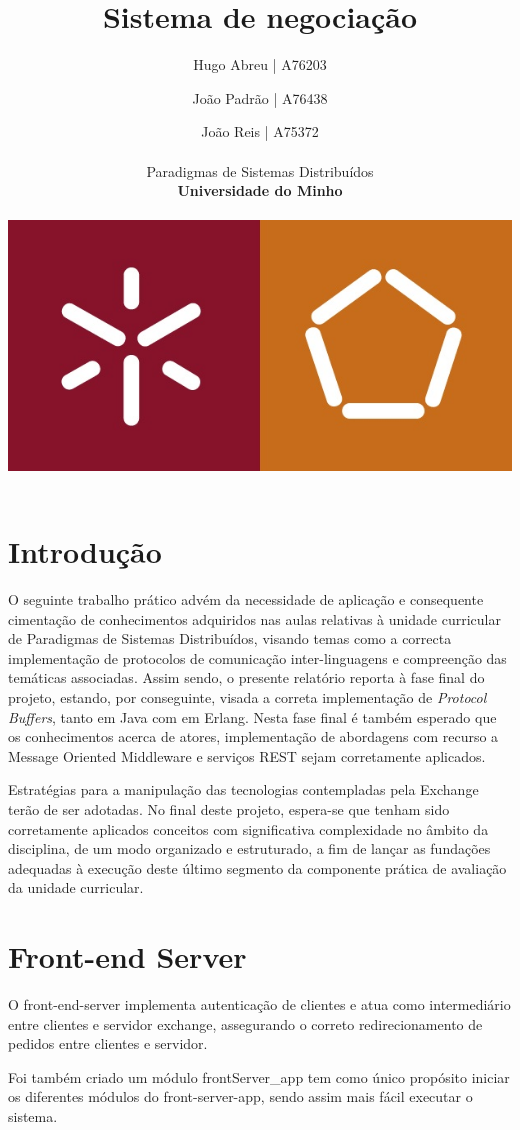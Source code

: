 \documentclass[a4paper,12pt]{article}
\title{Sistema de negociação}
\author{Hugo Abreu | A76203 \and João Padrão | A76438\and João Reis | A75372
\\\\ Paradigmas de Sistemas Distribuídos \\ \textbf{Universidade do Minho} \\ \\ \includegraphics[scale=0.25]{um_eeng}}
\begin{document}
\maketitle
\break

\section{Introdução}
O seguinte trabalho prático advém da necessidade de aplicação e consequente cimentação de conhecimentos adquiridos nas aulas relativas à unidade curricular de Paradigmas de Sistemas Distribuídos, visando temas como a correcta implementação de protocolos de comunicação inter-linguagens e compreenção das temáticas associadas. Assim sendo, o presente relatório reporta à fase final do projeto, estando, por conseguinte, visada a correta implementação de \textit{Protocol Buffers}, tanto em Java com em Erlang. Nesta fase final é também esperado que os conhecimentos acerca de atores, implementação de abordagens com recurso a Message Oriented Middleware e serviços REST sejam corretamente aplicados. 
\par Estratégias para a manipulação das tecnologias contempladas pela Exchange terão de ser adotadas. No final deste projeto, espera-se que tenham sido corretamente aplicados conceitos com significativa complexidade no âmbito da disciplina, de um modo organizado e estruturado, a fim de lançar as fundações adequadas à execução deste último segmento da componente prática de avaliação da unidade curricular.

\section{Front-end Server}
O front-end-server implementa autenticação de clientes e atua como intermediário entre clientes e servidor exchange, assegurando o correto redirecionamento de pedidos entre clientes e servidor. 
\par Foi também criado um módulo frontServer\_app tem como único propósito iniciar os diferentes módulos do front-server-app, sendo assim mais fácil executar o sistema.
\end{document}
